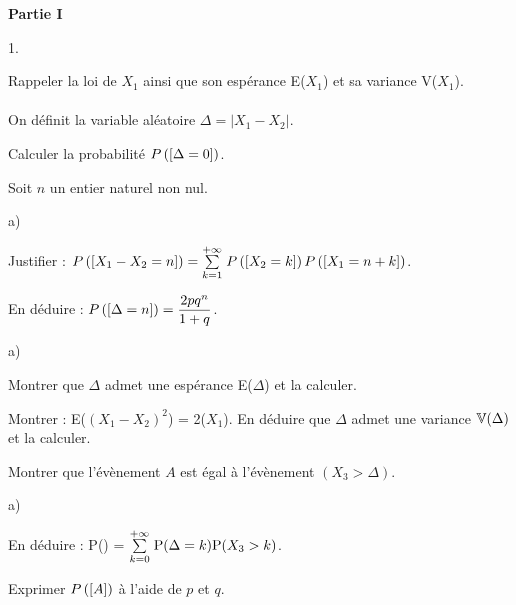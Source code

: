 \documentclass[11pt]{article}%
\begin{document}
{\bf Partie I}\\
\begin{noliste}{1.}
 \setlength{\itemsep}{4mm}
\item Rappeler la loi de $X_{1}$ ainsi que son espérance E($X_{1}$) et
sa variance V($X_{1}$).\\
\\
On définit la variable aléatoire $\Delta = |X_{1}-X_{2}|$.\\
\item Calculer la probabilité $P\left(\left[ {\Delta = 0} \right]\right)$.
\item Soit $n$ un entier naturel non nul.
\begin{noliste}{a)}
 \setlength{\itemsep}{2mm}
\item Justifier : $P\left(\left[ {X_{1}-X_{2} = n} \right]\right) = {\textstyle\sum\limits_{k = 1}^{+
\infty}}\hspace{.1cm}P\left(\left[ {X_{2} = k} \right]\right)P\left(\left[ {X_{1} = n + k} \right]\right)$.
\item En déduire : $P\left(\left[ {\Delta = n} \right]\right) = \dfrac{2pq^{n}}{1 +
q}$.
\end{noliste}
\item
\begin{noliste}{a)}
 \setlength{\itemsep}{2mm}
\item Montrer que $\Delta$ admet une espérance E($\Delta$) et la
calculer.
\item Montrer : E($(X_{1}-X_{2})^{2}$) = 2\V($X_{1}$). En déduire que
$\Delta$ admet une variance $\mathbb{V}(\Delta)$ et la calculer.
\end{noliste}
\item Montrer que l'évènement $A$ est égal à l'évènement
$(X_{3}>\Delta)$.
\item 
\begin{noliste}{a)}
 \setlength{\itemsep}{2mm}
\item En déduire : P\left(\right) = ${\textstyle\sum\limits_{k = 0}^{+
\infty}}\hspace{.1cm}\text{P}(\Delta = k)\text{P}(X_{3}>k)$.
\item Exprimer $P\left(\left[ {A} \right]\right)$ à l'aide de $p$ et $q$.\\
\end{noliste}
\end{noliste}
\end{document}
